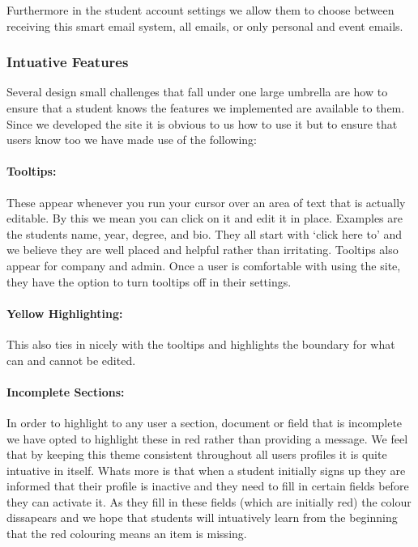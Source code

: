     Furthermore in the student account settings we allow them to choose between receiving this smart email system, all emails, or only personal and event emails.

  \subsubsection{Intuative Features}
    Several design small challenges that fall under one large umbrella are how to ensure that a student knows the features we implemented are available to them. Since we developed the site it is obvious to us how to use it but to ensure that users know too we have made use of the following:

    \paragraph{Tooltips:} These appear whenever you run your cursor over an area of text that is actually editable. By this we mean you can click on it and edit it in place. Examples are the students name, year, degree, and bio. They all start with `click here to' and we believe they are well placed and helpful rather than irritating.
    Tooltips also appear for company and admin. %
    Once a user is comfortable with using the site, they have the option to turn tooltips off in their settings.

    \paragraph{Yellow Highlighting:} This also ties in nicely with the tooltips and highlights the boundary for what can and cannot be edited.

    \paragraph{Incomplete Sections:} In order to highlight to any user a section, document or field that is incomplete we have opted to highlight these in red rather than providing a message. We feel that by keeping this theme consistent throughout all users profiles it is quite intuative in itself.
    Whats more is that when a student initially signs up they are informed that their profile is inactive and they need to fill in certain fields before they can activate it. As they fill in these fields (which are initially red) the colour dissapears and we hope that students will intuatively learn from the beginning that the red colouring means an item is missing.

